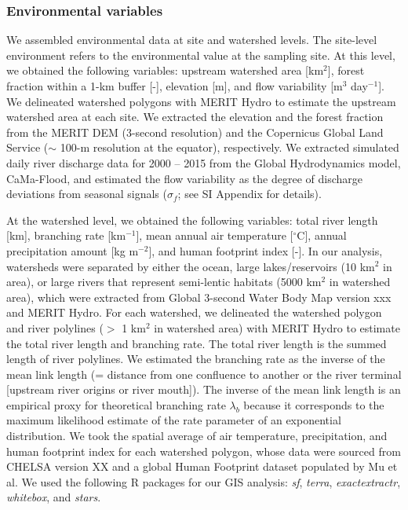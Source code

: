 \documentclass[11pt, class=article, crop=false]{standalone}
\begin{document}
\subsubsection{Environmental variables}

We assembled environmental data at site and watershed levels.
The site-level environment refers to the environmental value at the sampling site.
At this level, we obtained the following variables: upstream watershed area [km$^2$], forest fraction within a 1-km buffer [-], elevation [m], and flow variability [m$^3$ day$^{-1}$].
We delineated watershed polygons with MERIT Hydro to estimate the upstream watershed area at each site.
We extracted the elevation and the forest fraction from the MERIT DEM (3-second resolution) and the Copernicus Global Land Service ($\sim$ 100-m resolution at the equator), respectively.
We extracted simulated daily river discharge data for 2000 -- 2015 from the Global Hydrodynamics model, CaMa-Flood, and estimated the flow variability as the degree of discharge deviations from seasonal signals ($\sigma_f$; see SI Appendix for details).

At the watershed level, we obtained the following variables: total river length [km], branching rate [km$^{-1}$], mean annual air temperature [$^\circ$C], annual precipitation amount [kg m$^{-2}$], and human footprint index [-].
In our analysis, watersheds were separated by either the ocean, large lakes/reservoirs (10 km$^{2}$ in area), or large rivers that represent semi-lentic habitats (5000 km$^{2}$ in watershed area), which were extracted from Global 3-second Water Body Map version xxx and MERIT Hydro.
For each watershed, we delineated the watershed polygon and river polylines ($>$ 1 km$^2$ in watershed area) with MERIT Hydro to estimate the total river length and branching rate.
The total river length is the summed length of river polylines.
We estimated the branching rate as the inverse of the mean link length (= distance from one confluence to another or the river terminal [upstream river origins or river mouth]).
The inverse of the mean link length is an empirical proxy for theoretical branching rate $\lambda_b$ because it corresponds to the maximum likelihood estimate of the rate parameter of an exponential distribution.
We took the spatial average of air temperature, precipitation, and human footprint index for each watershed polygon, whose data were sourced from CHELSA version XX and a global Human Footprint dataset populated by Mu et al.
We used the following R packages for our GIS analysis: \textit{sf}, \textit{terra}, \textit{exactextractr}, \textit{whitebox}, and \textit{stars}.
\end{document}
